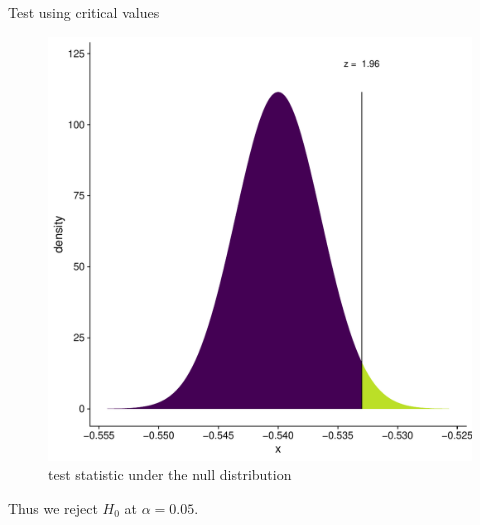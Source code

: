 \documentclass[10pt]{beamer}\usepackage[]{graphicx}\usepackage[]{color}
\makeatletter
\def\maxwidth{ %
  \ifdim\Gin@nat@width>\linewidth
    \linewidth
  \else
    \Gin@nat@width
  \fi
}
\newenvironment{knitrout}{}{} %
\makeatother
\begin{document}
\begin{frame}[fragile]{Test using critical values}
\begin{minipage}{0.47\textwidth}
\begin{knitrout}
\begin{figure}
{\centering \includegraphics[width=\maxwidth]{figure/unnamed-chunk-6-1} 

}

\caption[test statistic under the null distribution]{test statistic under the null distribution}\label{fig:unnamed-chunk-6}
\end{figure}

\end{knitrout}
	\end{minipage}	
	
	Thus we reject $H_0$ at $\alpha = 0.05$.
\end{frame}
\end{document}
